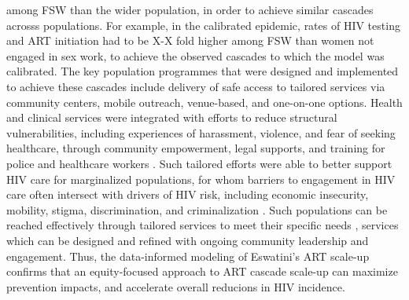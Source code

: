 among FSW than the wider population, in order to achieve similar cascades acrosss populations. 
For example, in the calibrated epidemic, rates of HIV testing and ART initiation had to be X-X fold higher among FSW than %
women not engaged in sex work, to achieve the observed cascades to which the model was calibrated.
The key population programmes that were designed and implemented to achieve these cascades include 
delivery of safe access to tailored services via
community centers, mobile outreach, venue-based, and one-on-one options. %
Health and clinical services were integrated with efforts to reduce structural vulnerabilities,
including experiences of harassment, violence, and fear of seeking healthcare,
through community empowerment, legal supports, and
training for police and healthcare workers \cite{EswIBBS2022}. %
Such tailored efforts were able to better support HIV care for marginalized populations,  %
for whom barriers to engagement in HIV care often intersect with drivers of HIV risk,
including economic insecurity, mobility, stigma, discrimination, and criminalization
\cite{Wanyenze2016,Schwartz2017,Schmidt-Sane2022,Camlin2019,Baral2019}.
Such populations can be reached effectively through 
tailored services to meet their specific needs \cite{EswIBBS2022,Ehrenkranz2019},
services which can be designed and refined with ongoing community leadership and engagement.
Thus, the data-informed modeling of Eswatini's ART scale-up confirms that 
an equity-focused approach to ART cascade scale-up %
can maximize prevention impacts, and accelerate overall reducions in HIV incidence. %
\par
